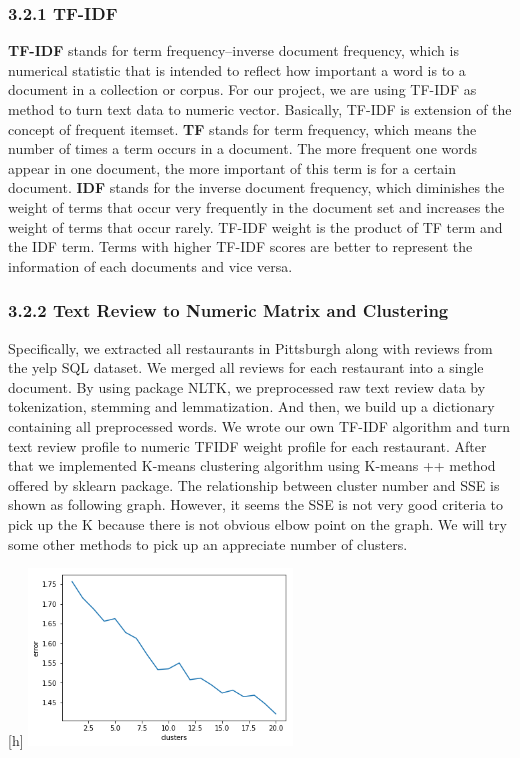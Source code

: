 \documentclass{neu_handout}
\begin{document}
\subsubsection*{3.2.1 TF-IDF}
\textbf{TF-IDF} stands for term frequency–inverse document frequency, which is numerical statistic that is intended to reflect how important a word is to a document in a collection or corpus. For our project, we are using TF-IDF as method to turn text data to numeric vector. Basically, TF-IDF is extension of the concept of frequent itemset. \textbf{TF} stands for term frequency, which means the number of times a term occurs in a document. The more frequent one words appear in one document, the more important of this term is for a certain document. \textbf{IDF} stands for the inverse document frequency, which diminishes the weight of terms that occur very frequently in the document set and increases the weight of terms that occur rarely. TF-IDF weight is the product of TF term and the IDF term. Terms with higher TF-IDF scores are better to represent the information of each documents and vice versa.

\subsubsection*{3.2.2 Text Review to Numeric Matrix and Clustering}
Specifically, we extracted all restaurants in Pittsburgh along with reviews from the yelp SQL dataset. We merged all reviews for each restaurant into a single document. By using package NLTK, we preprocessed raw text review data by tokenization, stemming and lemmatization. And then, we build up a dictionary containing all preprocessed words. We wrote our own TF-IDF algorithm and turn text review profile to numeric TFIDF weight profile for each restaurant. After that we implemented K-means clustering algorithm using K-means ++ method offered by sklearn package. The relationship between cluster number and SSE is shown as following graph. However, it seems the SSE is not very good criteria to pick up the K because there is not obvious elbow point on the graph. We will try some other methods to pick up an appreciate number of clusters. 

\begin{center}[h]
	\includegraphics[width=70mm,scale=0.5]{KvsError}
\end{center}
\end{document}
